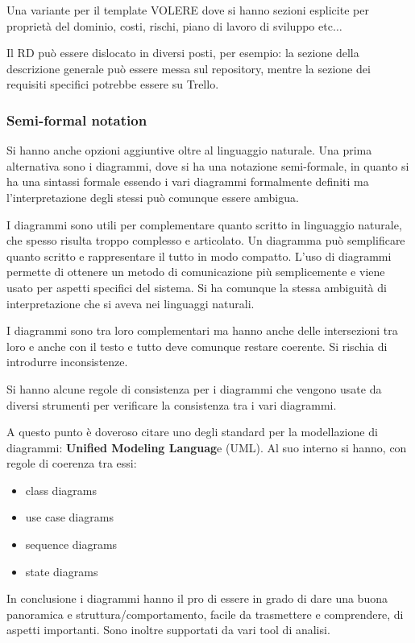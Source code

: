 Una variante per il template VOLERE dove si hanno sezioni esplicite per proprietà
del dominio, costi, rischi, piano di lavoro di sviluppo etc$\dots$

Il RD può essere dislocato in diversi posti, per esempio: la sezione della 
descrizione generale può essere messa sul repository, mentre la sezione dei 
requisiti specifici potrebbe essere su Trello.

\subsubsection{Semi-formal notation}
Si hanno anche opzioni aggiuntive oltre al linguaggio naturale. Una prima alternativa
sono i diagrammi, dove si ha una notazione semi-formale, in quanto si ha una sintassi
formale essendo i vari diagrammi formalmente definiti ma l'interpretazione degli
stessi può comunque essere ambigua.

I diagrammi sono utili per complementare quanto scritto in linguaggio naturale, che
spesso risulta troppo complesso e articolato. Un diagramma può semplificare quanto
scritto e rappresentare il tutto in modo compatto. L'uso di diagrammi permette
di ottenere un metodo di comunicazione più semplicemente e viene usato per aspetti
specifici del sistema. Si ha comunque la stessa ambiguità di interpretazione
che si aveva nei linguaggi naturali.

I diagrammi sono tra loro complementari ma hanno anche delle intersezioni tra
loro e anche con il testo e tutto deve comunque restare coerente. Si rischia di
introdurre inconsistenze.

Si hanno alcune regole di consistenza per i diagrammi che vengono usate da diversi
strumenti per verificare la consistenza tra i vari diagrammi.

A questo punto è doveroso citare uno degli standard per la modellazione di
diagrammi: \textbf{Unified Modeling Languag}e (UML). Al suo interno si hanno, con 
regole di coerenza tra essi:
\begin{itemize}
    \item class diagrams
    \item use case diagrams
    \item sequence diagrams
    \item state diagrams
\end{itemize}

In conclusione i diagrammi hanno il pro di essere in grado di dare una buona panoramica
e struttura/comportamento, facile da trasmettere e comprendere, di aspetti importanti.
Sono inoltre supportati da vari tool di analisi.

